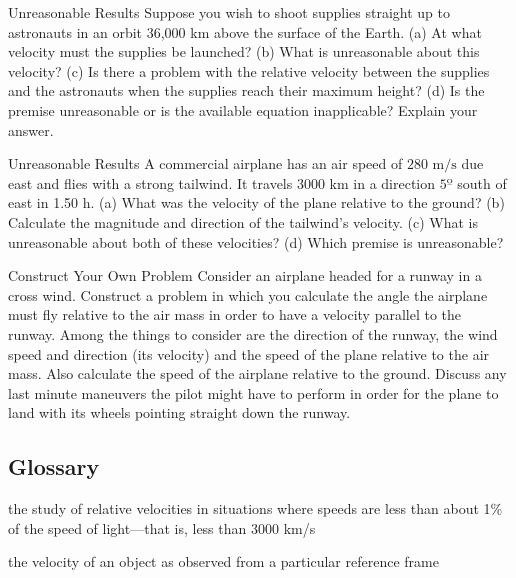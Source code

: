 \documentclass[
]{book}
\providecommand{\tightlist}{%
  \setlength{\itemsep}{0pt}\setlength{\parskip}{0pt}}
\begin{document}
\hypertarget{fs-id1839158}{}
\hypertarget{fs-id1839159}{}
{Unreasonable Results} Suppose you wish to shoot
supplies straight up to astronauts in an orbit 36,000 km above the
surface of the Earth. (a) At what velocity must the supplies be
launched? (b) What is unreasonable about this velocity? (c) Is there a
problem with the relative velocity between the supplies and the
astronauts when the supplies reach their maximum height? (d) Is the
premise unreasonable or is the available equation inapplicable? Explain
your answer.

\hypertarget{fs-id1915156}{}
\hypertarget{fs-id1915157}{}
{Unreasonable Results} A commercial airplane has an
air speed of \(\text{280~m/s}{}\) due east and flies with a strong
tailwind. It travels 3000 km in a direction \(5º{}\) south of east in 1.50
h. (a) What was the velocity of the plane relative to the ground? (b)
Calculate the magnitude and direction of the tailwind's velocity. (c)
What is unreasonable about both of these velocities? (d) Which premise
is unreasonable?

\hypertarget{fs-id1913487}{}
\hypertarget{fs-id1802325}{}
{Construct Your Own Problem} Consider an airplane
headed for a runway in a cross wind. Construct a problem in which you
calculate the angle the airplane must fly relative to the air mass in
order to have a velocity parallel to the runway. Among the things to
consider are the direction of the runway, the wind speed and direction
(its velocity) and the speed of the plane relative to the air mass. Also
calculate the speed of the airplane relative to the ground. Discuss any
last minute maneuvers the pilot might have to perform in order for the
plane to land with its wheels pointing straight down the runway.

\hypertarget{glossary-10}{%
\subsection{Glossary}\label{glossary-10}}

\begin{description}
\tightlist
\item[classical relativity]
the study of relative velocities in situations where speeds are less
than about 1\% of the speed of light---that is, less than 3000 km/s
\end{description}

\begin{description}
\tightlist
\item[relative velocity]
the velocity of an object as observed from a particular reference
frame
\end{description}
\end{document}
